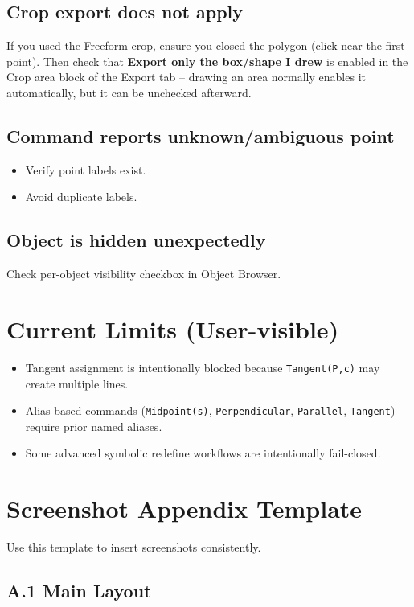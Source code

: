 \documentclass[11pt,a4paper]{article}
\begin{document}
\subsection{Crop export does not apply}
If you used the Freeform crop, ensure you closed the polygon (click near the first point). Then check that \textbf{Export only the box/shape I drew} is enabled in the Crop area block of the Export tab -- drawing an area normally enables it automatically, but it can be unchecked afterward.

\subsection{Command reports unknown/ambiguous point}
\begin{itemize}[leftmargin=1.5em]
  \item Verify point labels exist.
  \item Avoid duplicate labels.
\end{itemize}

\subsection{Object is hidden unexpectedly}
Check per-object visibility checkbox in Object Browser.

\section{Current Limits (User-visible)}
\begin{itemize}[leftmargin=1.5em]
  \item Tangent assignment is intentionally blocked because \texttt{Tangent(P,c)} may create multiple lines.
  \item Alias-based commands (\texttt{Midpoint(s)}, \texttt{Perpendicular}, \texttt{Parallel}, \texttt{Tangent}) require prior named aliases.
  \item Some advanced symbolic redefine workflows are intentionally fail-closed.
\end{itemize}

\appendix
\section{Screenshot Appendix Template}
Use this template to insert screenshots consistently.

\subsection*{A.1 Main Layout}
\end{document}
